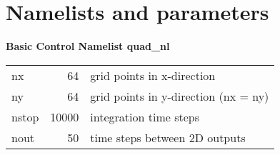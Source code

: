 \chapter{Namelists and parameters}

{\bf Basic Control Namelist quad{\_}nl} \\

\begin{tabular}{|l|r|l|}
 \hline
 \hline
 nx     &  64         & grid points in x-direction  \\
 ny     &  64         & grid points in y-direction (nx = ny) \\
 nstop  &  10000      & integration time steps      \\
 nout   &  50         & time steps between 2D outputs   \\
 \hline
\end{tabular}
